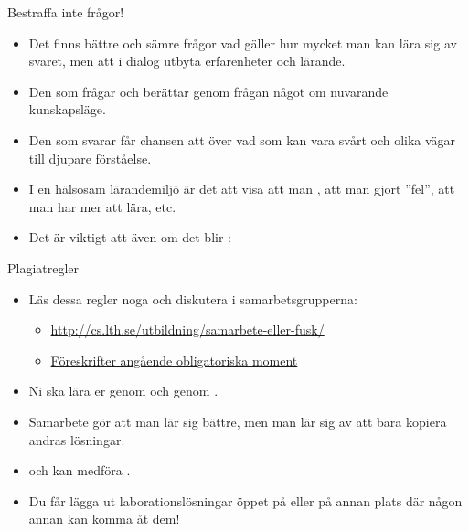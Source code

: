 \begin{SlideExtra}{Bestraffa inte frågor!}
\begin{itemize}
\item Det finns bättre och sämre frågor vad gäller hur mycket man kan lära sig av svaret, men  att i dialog utbyta erfarenheter och lärande.
\item Den som frågar  och berättar genom frågan något om nuvarande kunskapsläge.
\item Den som svarar får chansen att  över vad som kan vara svårt och olika vägar till djupare förståelse.
\item I en hälsosam lärandemiljö är det  att visa att man , att man gjort ''fel'', att man har mer att lära, etc.
\item Det är viktigt att  även om det blir :\\ 
\end{itemize}
\end{SlideExtra}

\begin{SlideExtra}{Plagiatregler}
\begin{itemize}
\item Läs dessa regler noga och diskutera i samarbetsgrupperna:

\begin{itemize}
\footnotesize
\item \url{http://cs.lth.se/utbildning/samarbete-eller-fusk/}
\item \href{http://cs.lth.se/utbildning/foereskrifter-angaaende-obligatoriska-moment/}{Föreskrifter angående obligatoriska moment}
\end{itemize}
\item Ni ska lära er genom  och genom  .
\item Samarbete gör att man lär sig bättre, men man lär sig  av att bara kopiera andras lösningar.
\item {} och kan medföra .
\item Du får  lägga ut laborationslösningar öppet på  eller på annan plats där någon annan kan komma åt dem!
\end{itemize}

\end{SlideExtra}

